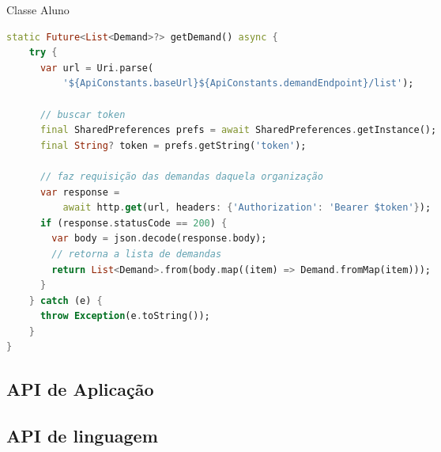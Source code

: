 \begin{sourcecode}[htb]
    \caption{\label{codigo:list-demands}Classe Aluno}
    \begin{lstlisting}[frame=single, language=Dart]
static Future<List<Demand>?> getDemand() async {
    try {
      var url = Uri.parse(
          '${ApiConstants.baseUrl}${ApiConstants.demandEndpoint}/list');
		  
	  // buscar token
      final SharedPreferences prefs = await SharedPreferences.getInstance();
      final String? token = prefs.getString('token');
	  
	  // faz requisição das demandas daquela organização
      var response =
          await http.get(url, headers: {'Authorization': 'Bearer $token'});
      if (response.statusCode == 200) {
        var body = json.decode(response.body);
		// retorna a lista de demandas
        return List<Demand>.from(body.map((item) => Demand.fromMap(item)));
      }
    } catch (e) {
	  throw Exception(e.toString());
    }
}
\end{lstlisting}
    \fonte{}
\end{sourcecode}

\subsection{API de Aplicação}\label{subsec:api-aplicacao}

\subsection{API de linguagem}\label{subsec:api-linguagens}




